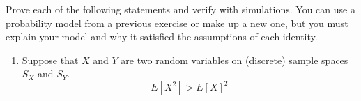  







\begin{exercise}
Prove each of the following statements and verify with simulations. You can use a probability model from a previous exercise or make up a new one, but you must explain your model and why it satisfied the assumptions of each identity. 
\begin{enumerate}[label=(\alpha*)]
\item Suppose that $X$ and $Y$ are two random variables on (discrete) sample spaces $S_X$ and $S_Y$. 
\begin{equation}
E[X^2]>E[X]^2
\end{equation}
\end{enumerate} 
\end{exercise}





%

%





